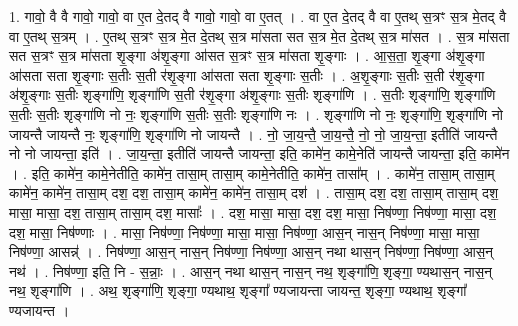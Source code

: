 \documentclass[17pt]{extarticle}
\begin{document}
1. गावो॒ वै वै गावो॒ गावो॒ वा ए॒त दे॒तद् वै गावो॒ गावो॒ वा ए॒तत् । . वा ए॒त दे॒तद् वै वा ए॒तथ् स॒त्रꣳ स॒त्र मे॒तद् वै वा ए॒तथ् स॒त्रम् । . ए॒तथ् स॒त्रꣳ स॒त्र मे॒त दे॒तथ् स॒त्र मा॑सता सत स॒त्र मे॒त दे॒तथ् स॒त्र मा॑सत । . स॒त्र मा॑सता सत स॒त्रꣳ स॒त्र मा॑सता शृ॒ङ्गा अ॑शृ॒ङ्गा आ॑सत स॒त्रꣳ स॒त्र मा॑सता शृ॒ङ्गाः । . आ॒स॒ता॒ शृ॒ङ्गा अ॑शृ॒ङ्गा आ॑सता सता शृ॒ङ्गाः स॒तीः स॒ती र॑शृ॒ङ्गा आ॑सता सता शृ॒ङ्गाः स॒तीः । . अ॒शृ॒ङ्गाः स॒तीः स॒ती र॑शृ॒ङ्गा अ॑शृ॒ङ्गाः स॒तीः शृङ्गा॑णि॒ शृङ्गा॑णि स॒ती र॑शृ॒ङ्गा अ॑शृ॒ङ्गाः स॒तीः शृङ्गा॑णि । . स॒तीः शृङ्गा॑णि॒ शृङ्गा॑णि स॒तीः स॒तीः शृङ्गा॑णि नो नः॒ शृङ्गा॑णि स॒तीः स॒तीः शृङ्गा॑णि नः । . शृङ्गा॑णि नो नः॒ शृङ्गा॑णि॒ शृङ्गा॑णि नो जायन्तै जायन्तै नः॒ शृङ्गा॑णि॒ शृङ्गा॑णि नो जायन्तै । . नो॒ जा॒य॒न्तै॒ जा॒य॒न्तै॒ नो॒ नो॒ जा॒य॒न्ता॒ इतीति॑ जायन्तै नो नो जायन्ता॒ इति॑ । . जा॒य॒न्ता॒ इतीति॑ जायन्तै जायन्ता॒ इति॒ कामे॑न॒ कामे॒नेति॑ जायन्तै जायन्ता॒ इति॒ कामे॑न । . इति॒ कामे॑न॒ कामे॒नेतीति॒ कामे॑न॒ तासा॒म् तासा॒म् कामे॒नेतीति॒ कामे॑न॒ तासा᳚म् । . कामे॑न॒ तासा॒म् तासा॒म् कामे॑न॒ कामे॑न॒ तासा॒म् दश॒ दश॒ तासा॒म् कामे॑न॒ कामे॑न॒ तासा॒म् दश॑ । . तासा॒म् दश॒ दश॒ तासा॒म् तासा॒म् दश॒ मासा॒ मासा॒ दश॒ तासा॒म् तासा॒म् दश॒ मासाः᳚ । . दश॒ मासा॒ मासा॒ दश॒ दश॒ मासा॒ निष॑ण्णा॒ निष॑ण्णा॒ मासा॒ दश॒ दश॒ मासा॒ निष॑ण्णाः । . मासा॒ निष॑ण्णा॒ निष॑ण्णा॒ मासा॒ मासा॒ निष॑ण्णा॒ आस॒न् नास॒न् निष॑ण्णा॒ मासा॒ मासा॒ निष॑ण्णा॒ आसन्न्॑ । . निष॑ण्णा॒ आस॒न् नास॒न् निष॑ण्णा॒ निष॑ण्णा॒ आस॒न् नथा थास॒न् निष॑ण्णा॒ निष॑ण्णा॒ आस॒न् नथ॑ । . निष॑ण्णा॒ इति॒ नि - स॒न्नाः॒ । . आस॒न् नथा थास॒न् नास॒न् नथ॒ शृङ्गा॑णि॒ शृङ्गा॒ ण्यथास॒न् नास॒न् नथ॒ शृङ्गा॑णि । . अथ॒ शृङ्गा॑णि॒ शृङ्गा॒ ण्यथाथ॒ शृङ्गा᳚ ण्यजायन्ता जायन्त॒ शृङ्गा॒ ण्यथाथ॒ शृङ्गा᳚ ण्यजायन्त । \newline
\end{document}
